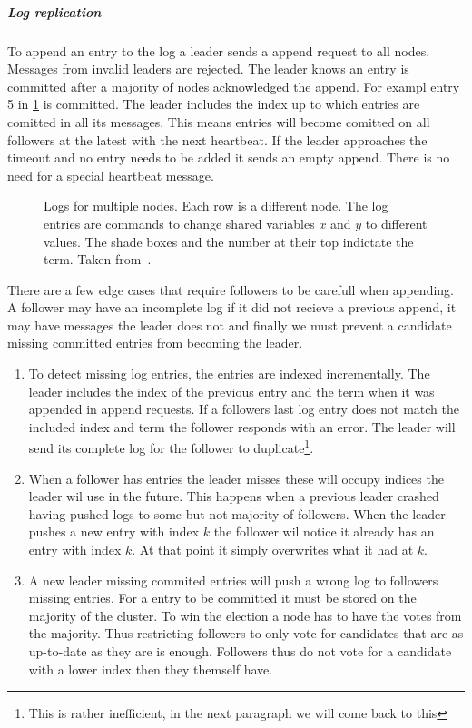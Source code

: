 \subparagraph{Log replication}
To append an entry to the log a leader sends a append request to all nodes. Messages from invalid leaders  are rejected. The leader knows an entry is committed after a majority of nodes acknowledged the append. For exampl entry 5 in \cref{fig:raft_entries} is committed. The leader includes the index up to which entries are comitted in all its messages. This means entries will become comitted on all followers at the latest with the next heartbeat. If the leader approaches the timeout and no entry needs to be added it sends an empty append. There is no need for a special heartbeat message.

\begin{figure}[htbp]
	\centering
	
	\caption{Logs for multiple nodes. Each row is a different node. The log entries are commands to change shared variables $x$ and $y$ to different values. The shade boxes and the number at their top indictate the term. Taken from~\cite{raft}.}
	\label{fig:raft_entries}
\end{figure}

There are a few edge cases that require followers to be carefull when appending. A follower may have an incomplete log if it did not recieve a previous append, it may have messages the leader does not and finally we must prevent a candidate missing committed entries from becoming the leader.
%
\begin{enumerate}
	\item To detect missing log entries, the entries are indexed incrementally. The leader includes the index of the previous entry and the term when it was appended in append requests. If a followers last log entry does not match the included index and term the follower responds with an error. The leader will send its complete log for the follower to duplicate\footnote{This is rather inefficient, in the next paragraph we will come back to this}.
	\item When a follower has entries the leader misses these will occupy indices the leader wil use in the future. This happens when a previous leader crashed having pushed logs to some but not majority of followers. When the leader pushes a new entry with index $k$ the follower wil notice it already has an entry with index $k$. At that point it simply overwrites what it had at $k$.
	\item A new leader missing commited entries will push a wrong log to followers missing entries. For a entry to be committed it must be stored on the majority of the cluster. To win the election a node has to have the votes from the majority. Thus restricting followers to only vote for candidates that are as up-to-date as they are is enough. Followers thus do not vote for a candidate with a lower index then they themself have.
\end{enumerate}


